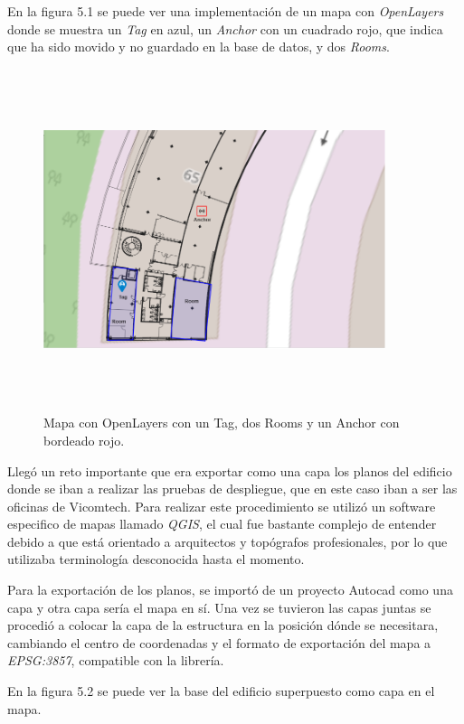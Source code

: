 En la figura 5.1 se puede ver una implementación de un mapa con \textit{OpenLayers} donde se muestra un \textit{Tag} en azul, un \textit{Anchor} con un cuadrado rojo, que indica que ha sido movido y no guardado en la base de datos, y dos \textit{Rooms}.
\begin{figure}[t]
    \centering
    \includegraphics[width=10cm,height=10cm,keepaspectratio]{img/OpenLayers.png}
    \caption{Mapa con OpenLayers con un Tag, dos Rooms y un Anchor con bordeado rojo.}
    \label{fig:Example OpenLayers}
\end{figure}

Llegó un reto importante que era exportar como una capa los planos del edificio donde se iban a realizar las pruebas de despliegue, que en este caso iban a ser las oficinas de Vicomtech. Para realizar este procedimiento se utilizó un software especifico de mapas llamado \textit{QGIS}, el cual fue bastante complejo de entender debido a que está orientado a arquitectos y topógrafos profesionales, por lo que utilizaba terminología desconocida hasta el momento.

Para la exportación de los planos, se importó de un proyecto Autocad como una capa y otra capa sería el mapa en sí. Una vez se tuvieron las capas juntas se procedió a colocar la capa de la estructura en la posición dónde se necesitara, cambiando el centro de coordenadas y el formato de exportación del mapa a \textit{EPSG:3857}, compatible con la librería. 

En la figura 5.2 se puede ver la base del edificio superpuesto como capa en el mapa.

